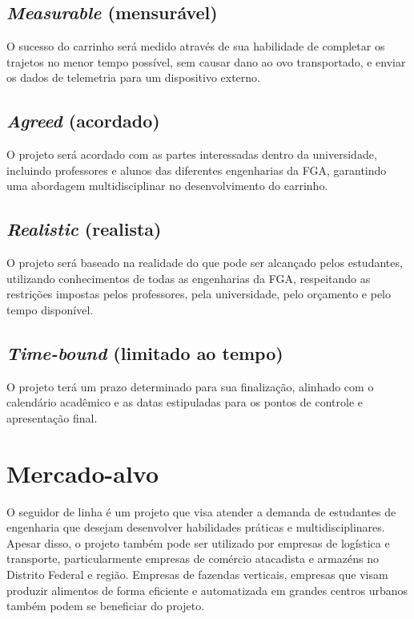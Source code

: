 \subsection{\textit{Measurable} (mensurável)}

O sucesso do carrinho será medido através de sua habilidade de completar os
trajetos no menor tempo possível, sem causar dano ao ovo transportado, e
enviar os dados de telemetria para um dispositivo externo.

\subsection{\textit{Agreed} (acordado)}

O projeto será acordado com as partes interessadas dentro da universidade,
incluindo professores e alunos das diferentes engenharias da FGA, garantindo
uma abordagem multidisciplinar no desenvolvimento do carrinho.

\subsection{\textit{Realistic} (realista)}

O projeto será baseado na realidade do que pode ser alcançado pelos estudantes,
utilizando conhecimentos de todas as engenharias da FGA, respeitando as
restrições impostas pelos professores, pela universidade, pelo orçamento e
pelo tempo disponível.

\subsection{\textit{Time-bound} (limitado ao tempo)}

O projeto terá um prazo determinado para sua finalização, alinhado com o
calendário acadêmico e as datas estipuladas para os pontos de controle e
apresentação final.

\section{Mercado-alvo}

O seguidor de linha é um projeto que visa atender a demanda de estudantes de
engenharia que desejam desenvolver habilidades práticas e multidisciplinares.
Apesar disso, o projeto também pode ser utilizado por empresas de logística e
transporte, particularmente empresas de comércio atacadista e armazéns no
Distrito Federal e região. Empresas de fazendas verticais, empresas que visam
produzir alimentos de forma eficiente e automatizada em grandes centros urbanos
também podem se beneficiar do projeto.
